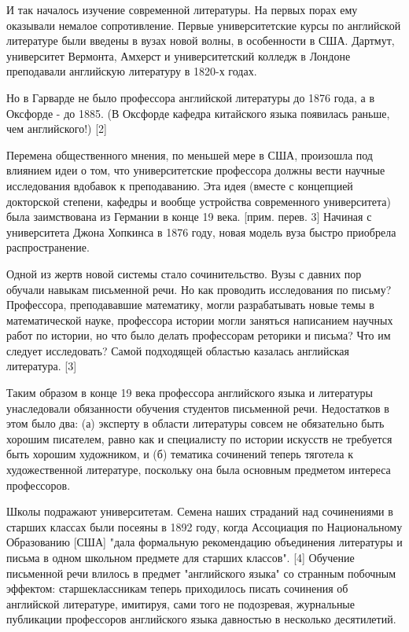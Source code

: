 \documentclass[ebook,12pt,oneside,openany]{memoir}
\begin{document}
И так началось изучение современной литературы. На первых порах ему
оказывали немалое сопротивление. Первые университетские курсы по
английской литературе были введены в вузах новой волны, в особенности
в США. Дартмут, университет Вермонта, Амхерст и университетский
колледж в Лондоне преподавали английскую литературу в 1820-х годах.

Но в Гарварде не было профессора английской литературы до 1876 года, а
в Оксфорде - до 1885. (В Оксфорде кафедра китайского языка появилась
раньше, чем английского!) [2]

Перемена общественного мнения, по меньшей мере в США, произошла под
влиянием идеи о том, что университетские профессора должны вести
научные исследования вдобавок к преподаванию. Эта идея (вместе с
концепцией докторской степени, кафедры и вообще устройства
современного университета) была заимствована из Германии в конце 19
века. [прим. перев. 3] Начиная с университета Джона Хопкинса в 1876
году, новая модель вуза быстро приобрела распространение.

Одной из жертв новой системы стало сочинительство. Вузы с давних пор
обучали навыкам письменной речи. Но как проводить исследования по
письму? Профессора, преподававшие математику, могли разрабатывать
новые темы в математической науке, профессора истории могли заняться
написанием научных работ по истории, но что было делать профессорам
реторики и письма? Что им следует исследовать? Самой подходящей
областью казалась английская литература. [3]

Таким образом в конце 19 века профессора английского языка и
литературы унаследовали обязанности обучения студентов письменной
речи. Недостатков в этом было два: (а) эксперту в области литературы
совсем не обязательно быть хорошим писателем, равно как и специалисту
по истории искусств не требуется быть хорошим художником, и (б)
тематика сочинений теперь тяготела к художественной литературе,
поскольку она была основным предметом интереса профессоров.

Школы подражают университетам. Семена наших страданий над сочинениями
в старших классах были посеяны в 1892 году, когда Ассоциация по
Национальному Образованию [США] "дала формальную рекомендацию
объединения литературы и письма в одном школьном предмете для старших
классов". [4] Обучение письменной речи влилось в предмет "английского
языка" со странным побочным эффектом: старшеклассникам теперь
приходилось писать сочинения об английской литературе, имитируя, сами
того не подозревая, журнальные публикации профессоров английского
языка давностью в несколько десятилетий.
\end{document}
